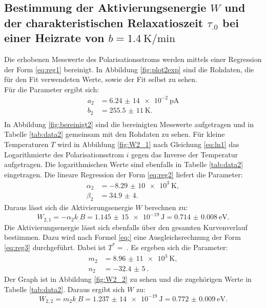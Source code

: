 \subsection{Bestimmung der Aktivierungsenergie $W$ und der charakteristischen Relaxatioszeit $\tau_.0$ bei einer Heizrate von $b=\SI{1,4}{\kelvin\per\minute}$}

Die erhobenen Messwerte des Polarisationsstroms werden mittels einer Regression der Form \eqref{eq:reg1} bereinigt. In Abbildung \ref{fig:plot2exp} sind die Rohdaten, die für den Fit verwendeten Werte, sowie der Fit selbst zu sehen.\\
Für die Parameter ergibt sich:
\begin{align*}
a_2&=\SI{6,24(14)e-2}{\pico\ampere}\\
b_2&=\SI{255,5(11)}{\kelvin}\text{.}\\
\end{align*}
In Abbildung \ref{fig:bereinigt2} sind die bereinigten Messwerte aufgetragen und in Tabelle \ref{tab:data2} gemeinsam mit den Rohdaten zu sehen.
Für kleine Temperaturen $T$ wird in Abbildung \ref{fig:W2_1} nach Gleichung \eqref{eq:ln1} das Logarithmierte des Polarisationsstrom $i$ gegen das Inverse der Temperatur aufgetragen. Die logarithmischen Werte sind ebenfalls in Tabelle \ref{tab:data2} eingetragen.
Die lineare Regression der Form \eqref{eq:reg2} liefert die Parameter:
\begin{align*}
\alpha_2&=\SI{-8,29(10)e3}{\kelvin},\\
\beta_2 &= \num{34,9(4)}\text{.}
\end{align*}
Daraus lässt sich die Aktivierungsenergie $W$ berechnen zu:
\[
W_{2,1} = -\alpha_2 k_.B =\SI{1,145(15)e-19}{\joule}=\SI{0.714(8)}{\electronvolt}\text{.}
\]
Die Aktivierungsenergie lässt sich ebenfalls über den gesamten Kurvenverlauf bestimmen. Dazu wird nach Formel \eqref{eq:} eine Ausgleichsrechnung der Form \eqref{eq:reg3} durchgeführt. Dabei ist $T^*=\SI{}{}$. Es ergeben sich die Parameter:
\begin{align*}
m_2&=\SI{8,96(11)e3}{\kelvin},\\
n_2&=\SI{-32,4(5)}{}\text{.}
\end{align*}
Der Graph ist in Abbildung \ref{fig:W2_2} zu sehen und die zugehörigen Werte in Tabelle \ref{tab:data2}.
Daraus ergibt sich $W$ zu:
\[
W_{2,2} = m_2 k_.B =\SI{1,237(14)e-19}{\joule}=\SI{0.772(9)}{\electronvolt}\text{.}
\]

